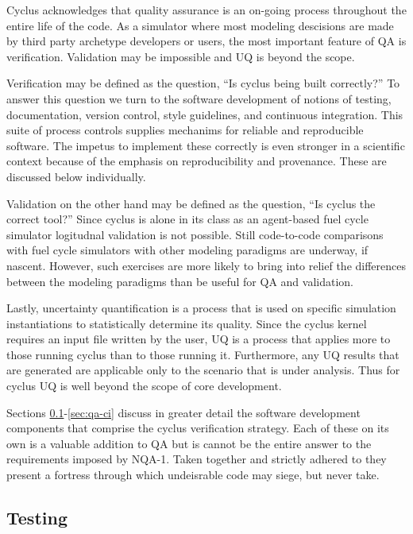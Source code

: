 Cyclus acknowledges that quality assurance is an on-going process throughout the 
entire life of the code. As a simulator where most modeling descisions are made 
by third party archetype developers or users, the most important feature of QA 
is verification. Validation may be impossible and UQ is beyond the scope.

Verification may be defined as the question, ``Is cyclus being built correctly?'' 
To answer this question we turn to the software development of notions of testing,
documentation, version control, style guidelines, and continuous integration. 
This suite of process controls supplies mechanims for reliable and reproducible 
software. The impetus to implement these correctly is even stronger in a scientific 
context because of the emphasis on reproducibility and provenance. These are 
discussed below individually.

Validation on the other hand may be defined as the question, 
``Is cyclus the correct tool?''
Since cyclus is alone in its class as an agent-based fuel cycle simulator logitudnal 
validation is not possible. Still code-to-code comparisons with fuel cycle
simulators with other modeling paradigms are underway, if nascent. However, such 
exercises are more likely to bring into relief the differences between the modeling
paradigms than be useful for QA and validation. 

Lastly, uncertainty quantification is a process that is used on specific simulation
instantiations to statistically determine its quality. Since the cyclus 
kernel requires an input file written by the user, UQ is a process that applies 
more to those running cyclus than to those running it.  Furthermore, any UQ
results that are generated are applicable only to the scenario that is under 
analysis. Thus for cyclus UQ is well beyond the scope of core development.

Sections \ref{sec:qa-testing}-\ref{sec:qa-ci} discuss in greater detail the software 
development components that comprise the cyclus verification strategy.
Each of these on its own is a valuable addition to QA but is cannot be the 
entire answer to the requirements imposed by NQA-1. Taken together and strictly 
adhered to they present a fortress through which undeisrable code may siege, 
but never take.

\subsection{Testing}
\label{sec:qa-testing}

